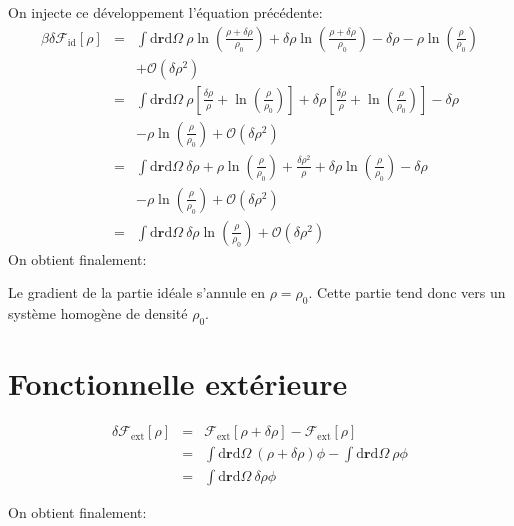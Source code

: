 On injecte ce développement l'équation précédente:
\begin{eqnarray}
\beta \delta \mathcal{F}_\mathrm{id}[\rho] &=& \int\mathrm{d}\boldsymbol{r}\mathrm{d}\Omega\ \rho \ln(\frac{\rho + \delta \rho}{\rho_0})  + \delta \rho\ln(\frac{\rho + \delta \rho}{\rho_0}) - \delta\rho - \rho\ln(\frac{\rho}{\rho_0})\\
& & + \mathcal{O}(\delta\rho^{2}) \nonumber \\
&=& \int\mathrm{d}\boldsymbol{r}\mathrm{d}\Omega\ \rho [\frac{\delta \rho}{\rho} + \ln(\frac{\rho}{\rho_0})] + \delta \rho[\frac{\delta \rho}{\rho} + \ln(\frac{\rho}{\rho_0})] - \delta\rho \\
& & - \rho\ln(\frac{\rho}{\rho_0}) + \mathcal{O}(\delta\rho^{2}) \nonumber \\
&=& \int\mathrm{d}\boldsymbol{r}\mathrm{d}\Omega\ \delta\rho + \rho \ln(\frac{\rho}{\rho_0}) + \frac{\delta \rho^2}{\rho} + \delta \rho \ln(\frac{\rho}{\rho_0}) - \delta\rho \\
& & - \rho\ln(\frac{\rho}{\rho_0}) + \mathcal{O}(\delta\rho^{2}) \nonumber \\
&=& \int\mathrm{d}\boldsymbol{r}\mathrm{d}\Omega\ \delta \rho \ln(\frac{\rho}{\rho_0}) + \mathcal{O}(\delta\rho^{2})
\end{eqnarray}
On obtient finalement:

Le gradient de la partie idéale s'annule en $\rho=\rho_0$. Cette partie tend donc vers un système homogène de densité $\rho_0$.


\section{Fonctionnelle extérieure}
\label{sec:annexes:grad:ext}
\begin{eqnarray}
\delta \mathcal{F}_\mathrm{ext}[\rho] &=& \mathcal{F}_\mathrm{ext}[\rho + \delta \rho] -\mathcal{F}_\mathrm{ext}[\rho] \\
&=& \int\mathrm{d}\boldsymbol{r}\mathrm{d}\Omega\ (\rho+\delta\rho)\phi - \int\mathrm{d}\boldsymbol{r}\mathrm{d}\Omega\ \rho\phi  \\
&=& \int\mathrm{d}\boldsymbol{r}\mathrm{d}\Omega\ \delta\rho\phi
\end{eqnarray}

On obtient finalement:

